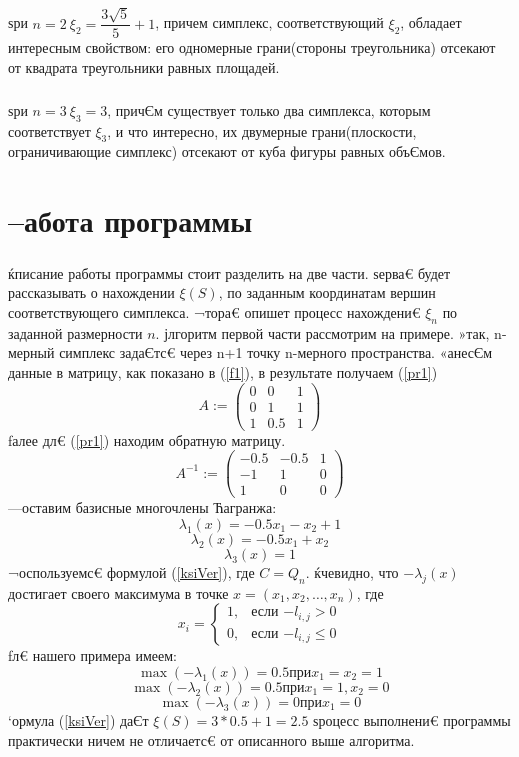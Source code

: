 \documentclass[12pt]{article} %
\begin{document}
	\subparagraph{}ѕри $n = 2\ \xi_2 = \dfrac{3\sqrt{5}}{5} + 1$, причем симплекс, соответствующий $\xi_2$, обладает интересным свойством: его одномерные грани(стороны треугольника) отсекают от квадрата треугольники равных площадей.
	
	\subparagraph{}ѕри $n = 3\ \xi_3 = 3$, причЄм существует только два симплекса, которым соответствует $\xi_3$, и что интересно, их двумерные грани(плоскости, ограничивающие симплекс) отсекают от куба фигуры равных объЄмов.
	\newpage







\section{–абота программы}
\subparagraph{}ќписание работы программы стоит разделить на две части. ѕерва€ будет рассказывать о нахождении $\xi(S)$, по заданным координатам вершин соответствующего симплекса. ¬тора€ опишет процесс нахождени€ $\xi_n$ по заданной размерности $n$.
јлгоритм первой части рассмотрим на примере. »так, n-мерный симплекс задаЄтс€ через n+1 точку n-мерного пространства. «анесЄм данные в матрицу, как показано в (\ref{f1}), в результате получаем  (\ref{pr1})
\begin{equation}\label{pr1}
		A :=
		\begin{pmatrix}
			0 & 0 & 1 \\
			0 & 1 & 1 \\
			1 & 0.5 & 1
		\end{pmatrix}
\end{equation}
ƒалее дл€ (\ref{pr1}) находим обратную матрицу.
\begin{equation}\label{pr2}
		A^{-1} :=
		\begin{pmatrix}
			-0.5 & -0.5 & 1 \\
			-1 & 1 & 0 \\
			1 & 0 & 0
		\end{pmatrix}
\end{equation}
—оставим базисные многочлены Ћагранжа:
$$\lambda_1(x)=-0.5x_1-x_2+1$$
$$\lambda_2(x)=-0.5x_1+x_2$$
$$\lambda_3(x)=1$$
¬оспользуемс€ формулой (\ref{ksiVer}), где $C=Q_n$. ќчевидно, что $-\lambda_j(x)$ достигает своего максимума в точке $x=(x_1,x_2,\dots,x_n)$, где
\begin{equation*}
x_i = 
 \begin{cases}
   1, &\text{если $-l_{i,j}>0$}\\
   0, &\text{если $-l_{i,j}\le0$}
 \end{cases}
\end{equation*}
ƒл€ нашего примера имеем:
$$\max(-\lambda_1(x))=0.5 \text{при} x_1=x_2=1$$
$$\max(-\lambda_2(x))=0.5 \text{при} x_1=1, x_2=0$$
$$\max(-\lambda_3(x))=0 \text{при} x_1=0$$
‘ормула (\ref{ksiVer}) даЄт $\xi(S)=3*0.5+1=2.5$
ѕроцесс выполнени€ программы практически ничем не отличаетс€ от описанного выше алгоритма.
\end{document}
